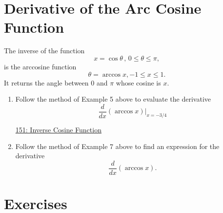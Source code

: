 \documentclass{ximera}
\begin{document}
\section{Derivative of the Arc Cosine Function}
The inverse of the function
\[
   x = \cos \theta \, , \, 0\leq \theta \leq \pi ,
\]
is the arccosine function
\[
 \theta = \arccos x , -1\leq x \leq 1 .
\]
It returns the angle between $0$ and $\pi$ whose cosine is $x$.

\begin{exercise} \label{EODFerDFghg}
\begin{enumerate}

\item Follow the method of Example 5 above to evaluate the derivative 
\[
        \frac{d}{dx} \left( \arccos x  \right)\Big|_{x=-3/4}
\]

\begin{onlineOnly}
    \begin{center}
\end{center}
\end{onlineOnly}

\href{https://www.desmos.com/calculator/hgxqjixv4n}{151: Inverse Cosine Function}

\item Follow the method of Example 7 above to find an expression for the derivative
\[
   \frac{d}{dx} \left( \arccos x  \right) .
\]
\end{enumerate}

\end{exercise}

\section{Exercises}
\end{document}
